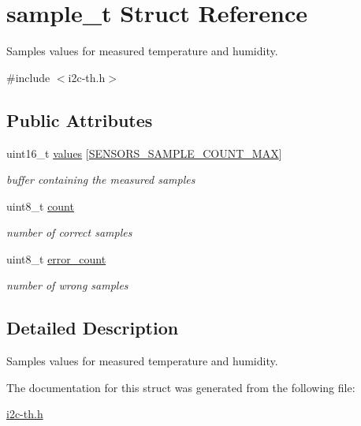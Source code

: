 \hypertarget{structsample__t}{}\section{sample\+\_\+t Struct Reference}
\label{structsample__t}


Samples values for measured temperature and humidity.  




{\ttfamily \#include $<$i2c-\/th.\+h$>$}

\subsection*{Public Attributes}
\begin{DoxyCompactItemize}
\item 
\mbox{\label{structsample__t_ab732cec6be98318b8f13563577f7d528}} 
uint16\+\_\+t \hyperlink{structsample__t_ab732cec6be98318b8f13563577f7d528}{values} \mbox{[}\hyperlink{i2c-th-config_8h_a5500c7c28f9fc2cab4deffbe07c98b39}{S\+E\+N\+S\+O\+R\+S\+\_\+\+S\+A\+M\+P\+L\+E\+\_\+\+C\+O\+U\+N\+T\+\_\+\+M\+AX}\mbox{]}
\begin{DoxyCompactList}\small\item\em buffer containing the measured samples \end{DoxyCompactList}\item 
\mbox{\label{structsample__t_a5a28abacf173c495a32a6f727e5d016e}} 
uint8\+\_\+t \hyperlink{structsample__t_a5a28abacf173c495a32a6f727e5d016e}{count}
\begin{DoxyCompactList}\small\item\em number of correct samples \end{DoxyCompactList}\item 
\mbox{\label{structsample__t_abcd5ae40e49c9c7bbfed40552ba44e72}} 
uint8\+\_\+t \hyperlink{structsample__t_abcd5ae40e49c9c7bbfed40552ba44e72}{error\+\_\+count}
\begin{DoxyCompactList}\small\item\em number of wrong samples \end{DoxyCompactList}\end{DoxyCompactItemize}


\subsection{Detailed Description}
Samples values for measured temperature and humidity. 

The documentation for this struct was generated from the following file\+:\begin{DoxyCompactItemize}
\item 
\hyperlink{i2c-th_8h}{i2c-\/th.\+h}\end{DoxyCompactItemize}
